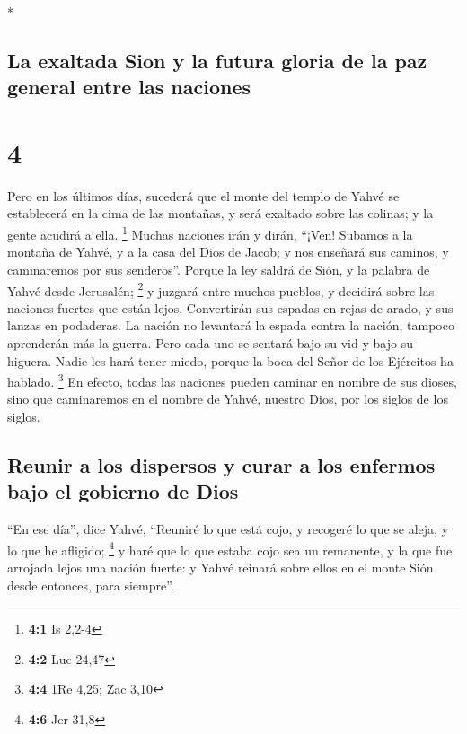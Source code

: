 \begin{paracol}{2}
\begin{otherlanguage}{english}
\end{otherlanguage}

\switchcolumn[0]*

\hypertarget{la-exaltada-sion-y-la-futura-gloria-de-la-paz-general-entre-las-naciones}{%
\subsection{La exaltada Sion y la futura gloria de la paz general entre
las
naciones}\label{la-exaltada-sion-y-la-futura-gloria-de-la-paz-general-entre-las-naciones}}

\hypertarget{section-6}{%
\section{4}\label{section-6}}

 Pero en los últimos días, sucederá que el monte del
templo de Yahvé se establecerá en la cima de las montañas, y será
exaltado sobre las colinas; y la gente acudirá a ella. \footnote{\textbf{4:1}
  Is 2,2-4}  Muchas naciones irán y dirán, ``¡Ven! Subamos
a la montaña de Yahvé, y a la casa del Dios de Jacob; y nos enseñará sus
caminos, y caminaremos por sus senderos''. Porque la ley saldrá de Sión,
y la palabra de Yahvé desde Jerusalén; \footnote{\textbf{4:2} Luc 24,47}
 y juzgará entre muchos pueblos, y decidirá sobre las
naciones fuertes que están lejos. Convertirán sus espadas en rejas de
arado, y sus lanzas en podaderas. La nación no levantará la espada
contra la nación, tampoco aprenderán más la guerra.  Pero
cada uno se sentará bajo su vid y bajo su higuera. Nadie les hará tener
miedo, porque la boca del Señor de los Ejércitos ha hablado. \footnote{\textbf{4:4}
  1Re 4,25; Zac 3,10}  En efecto, todas las naciones
pueden caminar en nombre de sus dioses, sino que caminaremos en el
nombre de Yahvé, nuestro Dios, por los siglos de los siglos.

\hypertarget{reunir-a-los-dispersos-y-curar-a-los-enfermos-bajo-el-gobierno-de-dios}{%
\subsection{Reunir a los dispersos y curar a los enfermos bajo el
gobierno de
Dios}\label{reunir-a-los-dispersos-y-curar-a-los-enfermos-bajo-el-gobierno-de-dios}}

 ``En ese día'', dice Yahvé, ``Reuniré lo que está cojo, y
recogeré lo que se aleja, y lo que he afligido; \footnote{\textbf{4:6}
  Jer 31,8}  y haré que lo que estaba cojo sea un
remanente, y la que fue arrojada lejos una nación fuerte: y Yahvé
reinará sobre ellos en el monte Sión desde entonces, para siempre''.


\end{paracol}

